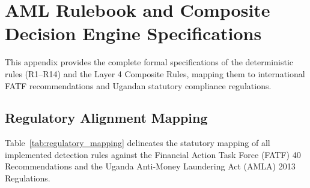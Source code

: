\chapter{AML Rulebook and Composite Decision Engine Specifications} \label{app:rulebook_specs}

This appendix provides the complete formal specifications of the deterministic rules (R1--R14) and the Layer 4 Composite Rules, mapping them to international FATF recommendations and Ugandan statutory compliance regulations.

\section{Regulatory Alignment Mapping}
Table~\ref{tab:regulatory_mapping} delineates the statutory mapping of all implemented detection rules against the Financial Action Task Force (FATF) 40 Recommendations and the Uganda Anti-Money Laundering Act (AMLA) 2013 Regulations.

